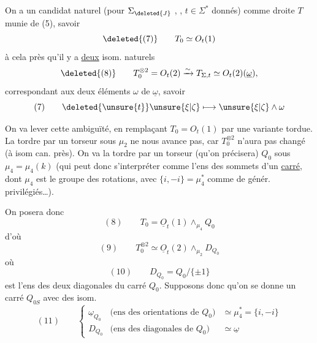 
On a un candidat naturel (pour $\Sigma_{\deleted{J}}$ ,  , $t\in\Sigma^*$ donnés) comme droite $T$ munie de (5), savoir
\[
\deleted{(7)}\qquad T_0\simeq O_t(1)
\]
à cela près qu'il y a \uline{deux} isom. naturels
\[
\deleted{(8)}\qquad T_0^{\otimes2}=O_t(2)\xrightarrow{\sim}T_{\Sigma,t}\simeq O_t(2)(\underline\omega),
\]
correspondant aux deux éléments $\omega$ de $\underline\omega$, savoir
\[
(7)\qquad\deleted{\unsure{t}}\unsure{\xi|\zeta}\longmapsto\unsure{\xi|\zeta}\wedge\omega
\]

On va lever cette ambiguïté, en remplaçant $T_0=O_t(1)$ par une variante tordue. La tordre par un torseur sous $\mu_2$  ne nous avance pas, car  $T_0^{\otimes2}$ n'aura pas changé (à isom can. près). On va la tordre par un torseur (qu'on précisera) $Q_0$ sous $\mu_4=\mu_4(k)$ (qui peut donc s'interpréter comme l'ens des sommets d'un \uline{carré}, dont $\mu_4$ est le groupe des rotations, avec $\{i,-i\}=\mu_4^*$ comme  de génér. privilégiés\ldots).

On posera donc
\[
(8)\qquad T_0=\underline O_t(1)\wedge_{\mu_4}Q_0
\]
d'où
\[
(9)\qquad T_0^{\otimes2}\simeq\underline O_t(2)\wedge_{\mu_2}D_{Q_0}
\]
où
\[
(10)\qquad D_{Q_0}=Q_0/\{\pm1\}
\]
est l'ens des deux diagonales du carré $Q_0$. Supposons donc qu'on se donne un carré  $Q_{0S}$ avec des isom. 
\[
(11)\qquad\left\{
\begin{array}{lll}
\underline\omega_{Q_0}&\text{(ens des orientations de $Q_0$)}&\simeq\mu_4^*=\{i,-i\}\\
D_{Q_0}&\text{(ens des diagonales de $Q_0$)}&\simeq\underline\omega
\end{array}\right.
\]
